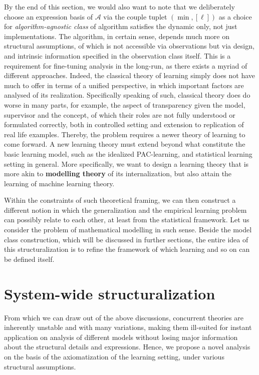 \documentclass[
  journal=largetwo,
  year=2025,
  volume=37,
]{cup-journal}
\begin{document}
By the end of this section, we would also want to note that we deliberately choose an expression basis of $\mathcal{A}$ via the couple tuplet $(\min, [\ell])$ as a choice for \textit{algorithm-agnostic class} of algorithm satisfies the dynamic only, not just implementations. The algorithm, in certain sense, depends much more on structural assumptions, of which is not accessible via observations but via design, and intrinsic information specified in the observation class itself. This is a requirement for fine-tuning analysis in the long-run, as there exists a myriad of different approaches. Indeed, the classical theory of learning simply does not have much to offer in terms of a unified perspective, in which important factors are analysed of its realization. Specifically speaking of such, classical theory does do worse in many parts, for example, the aspect of transparency given the model, supervisor and the concept, of which their roles are not fully understood or formulated correctly, both in controlled setting and extension to replication of real life examples. Thereby, the problem requires a newer theory of learning to come forward. A new learning theory must extend beyond what constitute the basic learning model, such as the idealized PAC-learning, and statistical learning setting in general. More specifically, we want to design a learning theory that is more akin to \textbf{modelling theory} of its internalization, but also attain the learning of machine learning theory. 

Within the constraints of such theoretical framing, we can then construct a different notion in which the generalization and the empirical learning problem can possibly relate to each other, at least from the statistical framework. Let us consider the problem of mathematical modelling in such sense. Beside the model class construction, which will be discussed in further sections, the entire idea of this structuralization is to refine the framework of which learning and so on can be defined itself. 

\section{System-wide structuralization}

From which we can draw out of the above discussions, concurrent theories are inherently unstable and with many variations, making them ill-suited for instant application on analysis of different models without losing major information about the structural details and expressions. Hence, we propose a novel analysis on the basis of the axiomatization of the learning setting, under various structural assumptions. 
\end{document}
